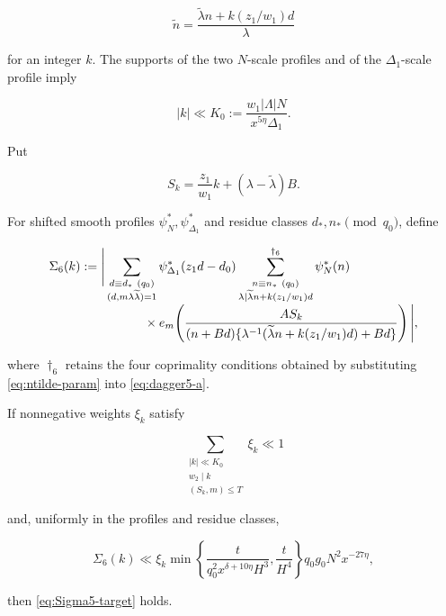 \begin{equation}\label{eq:ntilde-param}
 \widetilde n=
 \frac{\widetilde\lambda n+k(z_1/w_1)d}{\lambda}
\end{equation}

for an integer $k$.  The supports of the two $N$-scale profiles and of the
$\Delta_1$-scale profile imply

\begin{equation}\label{eq:k-range}
 |k|\ll K_0:=\frac{w_1|\Lambda|N}{x^{5\eta}\Delta_1}.
\end{equation}

Put

\begin{equation}\label{eq:S-k}
 S_k=\frac{z_1}{w_1}k+(\lambda-\widetilde\lambda)B.
\end{equation}

For shifted smooth profiles $\psi_N^*,\psi_{\Delta_1}^*$ and residue
classes $d_*,n_*\pmod{q_0}$, define

\begin{align}
\Sigma_6(k):={}&\Bigg|
 \sum_{\substack{d\equiv d_*\ (q_0)\\
 (d,m\lambda\widetilde\lambda)=1}}
 \psi_{\Delta_1}^*(z_1d-d_0)
 \sum_{\substack{n\equiv n_*\ (q_0)\\
 \lambda\mid\widetilde\lambda n+k(z_1/w_1)d}}^{\dagger_6}
 \psi_N^*(n)
 \notag\\[-1mm]
&\hspace{12mm}\times
 e_m\!\left(
 \frac{AS_k}
 {(n+Bd)
  \{\lambda^{-1}(\widetilde\lambda n+k(z_1/w_1)d)+Bd\}}
 \right)\Bigg|,
 \label{eq:Sigma6}
\end{align}

where $\dagger_6$ retains the four coprimality conditions obtained by
substituting \cref{eq:ntilde-param} into \cref{eq:dagger5-a}.

\begin{lemma}\label{lem:remove-ntilde}
If nonnegative weights $\xi_k$ satisfy

\begin{equation}\label{eq:xi-mass}
 \sum_{\substack{|k|\ll K_0\\w_2\mid k\\(S_k,m)\le T}}\xi_k\ll1
\end{equation}

and, uniformly in the profiles and residue classes,

\begin{equation}\label{eq:Sigma6-target}
 \Sigma_6(k)\ll \xi_k
 \min\left\{\frac{t}{q_0^2x^{\delta+10\eta}H^3},
              \frac{t}{H^4}\right\}
 q_0g_0N^2x^{-27\eta},
\end{equation}

then \cref{eq:Sigma5-target} holds.
\end{lemma}


